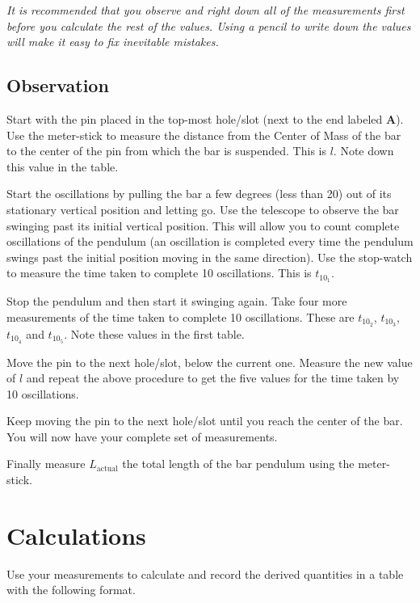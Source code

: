\documentclass{article}
\begin{document}
         \textit{It is recommended that you observe and right down all of the measurements first before you calculate the rest of the values. Using a pencil to write down the values will make it easy to fix inevitable mistakes.}

      \subsection*{Observation}

      Start with the pin placed in the top-most hole/slot (next to the end labeled \textbf{A}). Use the meter-stick to measure the distance from the Center of Mass of the bar to the center of the pin from which the bar is suspended. This is $l$. Note down this value in the table.

      Start the oscillations by pulling the bar a few degrees (less than 20) out of its stationary vertical position and letting go. Use the telescope to observe the bar swinging past its initial vertical position. This will allow you to count complete oscillations of the pendulum (an oscillation is completed every time the pendulum swings past the initial position moving in the same direction). Use the stop-watch to measure the time taken to complete 10 oscillations. This is $t_{10_1}$.

      Stop the pendulum and then start it swinging again. Take four more measurements of the time taken to complete 10 oscillations. These are $t_{10_2}$, $t_{10_3}$, $t_{10_4}$ and $t_{10_5}$. Note these values in the first table.

      Move the pin to the next hole/slot, below the current one. Measure the new value of $l$ and repeat the above procedure to get the five values for the time taken by 10 oscillations.

      Keep moving the pin to the next hole/slot until you reach the center of the bar. You will now have your complete set of measurements.

      Finally measure $L_\text{actual}$ the total length of the bar pendulum using the meter-stick.


   \section*{Calculations}

      Use your measurements to calculate and record the derived quantities in a table with the following format.
      
\end{document}

